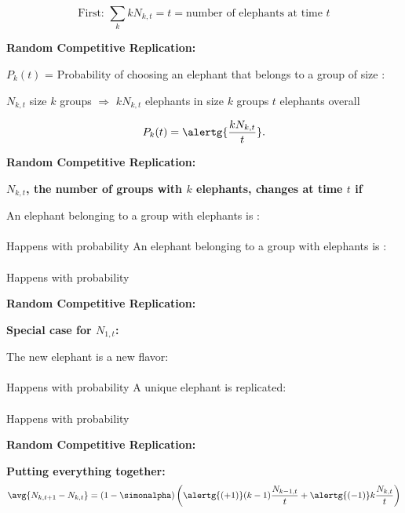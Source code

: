   {$$ \mbox{First:\ } \sum_{k} k N_{k,t} = t = \mbox{number of elephants at time $t$}$$}
  


  \textbf{Random Competitive Replication:}

  
  $P_k(t)$ = Probability of choosing an elephant that belongs
  to a group of size :

  
    $N_{k,t}$ size $k$ groups
    $\Rightarrow$ $kN_{k,t}$ elephants in size $k$ groups
    $t$ elephants overall
  
  {
    $$ P_k(t) = \alertg{\frac{k N_{k,t}}{ t}}.$$
  }
  


  \textbf{Random Competitive Replication:}

  \textbf{$N_{k,t}$, the number of groups with $k$ elephants, changes at time $t$ if}
    
     An elephant belonging to a group with  elephants is :\\
      {}\\
      {Happens with probability }
      \bigskip
     An elephant belonging to a group with  elephants is :\\
      {}\\
      {Happens with probability }
    
  


  \textbf{Random Competitive Replication:}

  \textbf{Special case for $N_{1,t}$:}
    
     The new elephant is a new flavor:\\
      {}\\
      {Happens with probability \alertg{$\simonalpha$}}
      \bigskip
     A unique elephant is replicated:\\
      {}\\
      {Happens with probability }
    
  


  \textbf{Random Competitive Replication:}

  \textbf{Putting everything together:}
  {  
    $$
    \avg{N_{k,t+1} - N_{k,t}}
    =
    (1-\simonalpha)
    \left(
      \alertg{(+1)}
      (k-1)\frac{N_{k-1,t}}{t}
      +
      \alertg{(-1)}
      k\frac{N_{k,t}}{t}
    \right)
    $$
  }
  

